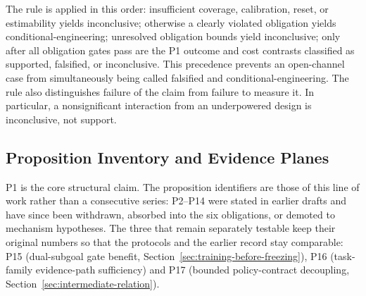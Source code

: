 The rule is applied in this order: insufficient coverage, calibration, reset, or estimability yields inconclusive; otherwise a clearly violated obligation yields conditional-engineering; unresolved obligation bounds yield inconclusive; only after all obligation gates pass are the P1 outcome and cost contrasts classified as supported, falsified, or inconclusive. This precedence prevents an open-channel case from simultaneously being called falsified and conditional-engineering. The rule also distinguishes failure of the claim from failure to measure it. In particular, a nonsignificant interaction from an underpowered design is inconclusive, not support.

\subsection{Proposition Inventory and Evidence Planes}

P1 is the core structural claim. The proposition identifiers are those of this line of work rather than a consecutive series: P2--P14 were stated in earlier drafts and have since been withdrawn, absorbed into the six obligations, or demoted to mechanism hypotheses. The three that remain separately testable keep their original numbers so that the protocols and the earlier record stay comparable: P15 (dual-subgoal gate benefit, Section~\ref{sec:training-before-freezing}), P16 (task-family evidence-path sufficiency) and P17 (bounded policy-contract decoupling, Section~\ref{sec:intermediate-relation}).

